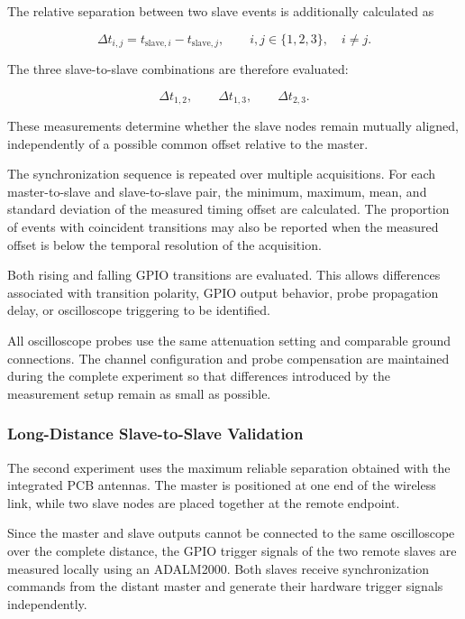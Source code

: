 The relative separation between two slave events is additionally calculated as

\begin{equation}
    \Delta t_{i,j}
    =
    t_{\mathrm{slave},i}
    -
    t_{\mathrm{slave},j},
    \qquad
    i,j\in\{1,2,3\},
    \quad i\neq j.
    \label{eq:sync_slave_slave_offset}
\end{equation}

The three slave-to-slave combinations are therefore evaluated:

\begin{equation}
    \Delta t_{1,2},
    \qquad
    \Delta t_{1,3},
    \qquad
    \Delta t_{2,3}.
\end{equation}

These measurements determine whether the slave nodes remain mutually aligned, independently of a possible common offset relative to the master.

The synchronization sequence is repeated over multiple acquisitions. For each master-to-slave and slave-to-slave pair, the minimum, maximum, mean, and standard deviation of the measured timing offset are calculated. The proportion of events with coincident transitions may also be reported when the measured offset is below the temporal resolution of the acquisition.

Both rising and falling GPIO transitions are evaluated. This allows differences associated with transition polarity, GPIO output behavior, probe propagation delay, or oscilloscope triggering to be identified.

All oscilloscope probes use the same attenuation setting and comparable ground connections. The channel configuration and probe compensation are maintained during the complete experiment so that differences introduced by the measurement setup remain as small as possible.

\subsubsection{Long-Distance Slave-to-Slave Validation}

The second experiment uses the maximum reliable separation obtained with the integrated PCB antennas. The master is positioned at one end of the wireless link, while two slave nodes are placed together at the remote endpoint.

Since the master and slave outputs cannot be connected to the same oscilloscope over the complete distance, the GPIO trigger signals of the two remote slaves are measured locally using an ADALM2000. Both slaves receive synchronization commands from the distant master and generate their hardware trigger signals independently.

